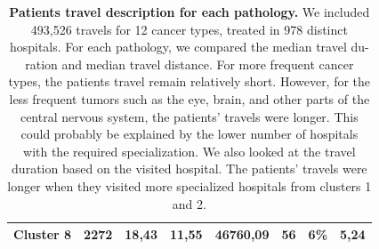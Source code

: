 \begin{table}[H]
{\begin{tabular}{|l|l|l|l|l|l|l|l|}
            Cluster 8                                                                        & 2272    & 18,43           & 11,55           & 46760,09       & 56       & 6\%       & 5,24               \\ \hline
        \end{tabular}
    } \caption{ \textbf{Patients travel description for each pathology.} We
        included 493,526 travels for 12 cancer types, treated in 978 distinct
        hospitals. For each pathology, we compared the median travel du-ration and
        median travel distance. For more frequent cancer types, the patients travel
        remain relatively short. However, for the less frequent tumors such as the
        eye, brain, and other parts of the central nervous system, the patients'
        travels were longer. This could probably be explained by the lower number of
        hospitals with the required specialization. We also looked at the travel
        duration based on the visited hospital. The patients' travels were longer
        when they visited more specialized hospitals from clusters 1 and 2. }
    \label{table:distance_and_co2}
\end{table}

